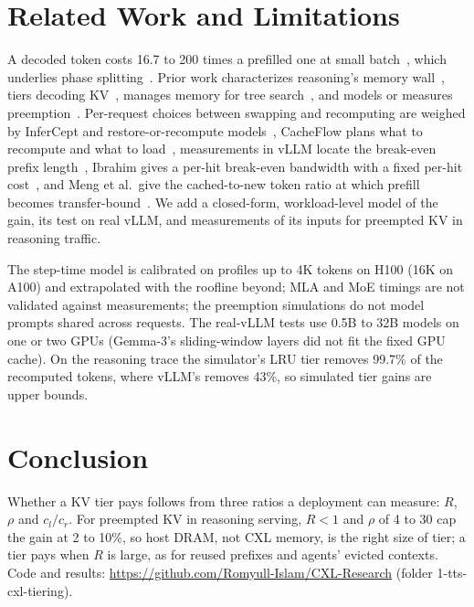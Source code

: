 \documentclass[journal]{IEEEtran}
\begin{document}
\section{Related Work and Limitations}
A decoded token costs 16.7 to 200 times a prefilled one at small batch~\cite{sarathi}, which
underlies phase splitting~\cite{splitwise,distserve}. Prior work characterizes reasoning's memory
wall~\cite{kinetics,infscaling}, tiers decoding KV~\cite{oasiskv,notallthoughts}, manages memory
for tree search~\cite{fasttts}, and models or measures preemption~\cite{congestion,rollpacker}. Per-request choices between swapping and recomputing are weighed by
InferCept and restore-or-recompute models~\cite{infercept,restore_recompute}, CacheFlow plans what to
recompute and what to load~\cite{cacheflow}, measurements in vLLM locate the
break-even prefix length~\cite{pykvcache}, Ibrahim gives a per-hit break-even bandwidth with a
fixed per-hit cost~\cite{ibrahim_kv}, and Meng et al.\ give the cached-to-new token ratio at which
prefill becomes transfer-bound~\cite{mengoffload}. We add a
closed-form, workload-level model of the gain, its test on real vLLM, and measurements of its inputs
for preempted KV in reasoning traffic.

The step-time model is calibrated on profiles up to 4K tokens on H100 (16K on A100) and extrapolated
with the roofline beyond; MLA and MoE timings are not validated against measurements; the preemption
simulations do not model prompts shared across requests. The real-vLLM tests use 0.5B to 32B models on one or two GPUs (Gemma-3's
sliding-window layers did not fit the fixed GPU cache). On the reasoning trace the simulator's LRU tier removes 99.7\% of the recomputed tokens, where
vLLM's removes 43\%, so simulated tier gains are upper bounds.

\section{Conclusion}
Whether a KV tier pays follows from three ratios a deployment can measure: $R$, $\rho$ and $c_l/c_r$.
For preempted KV in reasoning serving, $R<1$ and $\rho$ of 4 to 30 cap the gain at 2 to 10\%, so
host DRAM, not CXL memory, is the right size of tier; a tier pays when $R$ is large, as for reused
prefixes and agents' evicted contexts. Code and results:
\url{https://github.com/Romyull-Islam/CXL-Research} (folder 1-tts-cxl-tiering).



\end{document}
